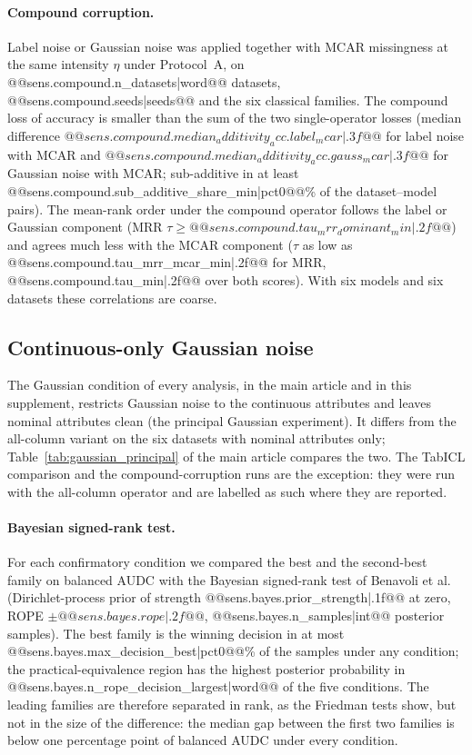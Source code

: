 \documentclass[pdflatex,sn-mathphys]{sn-jnl}
\theoremstyle{thmstyleone}
\begin{document}
\paragraph{Compound corruption.} Label noise or Gaussian noise was applied together with MCAR missingness at the same intensity $\eta$ under Protocol~A, on @@{sens.compound.n_datasets|word}@@ datasets, @@{sens.compound.seeds|seeds}@@ and the six classical families. The compound loss of accuracy is smaller than the sum of the two single-operator losses (median difference $@@{sens.compound.median_additivity_acc.label_mcar|.3f}@@$ for label noise with MCAR and $@@{sens.compound.median_additivity_acc.gauss_mcar|.3f}@@$ for Gaussian noise with MCAR; sub-additive in at least @@{sens.compound.sub_additive_share_min|pct0}@@\% of the dataset--model pairs). The mean-rank order under the compound operator follows the label or Gaussian component (MRR $\tau\ge@@{sens.compound.tau_mrr_dominant_min|.2f}@@$) and agrees much less with the MCAR component ($\tau$ as low as @@{sens.compound.tau_mrr_mcar_min|.2f}@@ for MRR, @@{sens.compound.tau_min|.2f}@@ over both scores). With six models and six datasets these correlations are coarse.

\subsection{Continuous-only Gaussian noise}
The Gaussian condition of every analysis, in the main article and in this supplement, restricts Gaussian noise to the continuous attributes and leaves nominal attributes clean (the principal Gaussian experiment). It differs from the all-column variant on the six datasets with nominal attributes only; Table~\ref{tab:gaussian_principal} of the main article compares the two. The TabICL comparison and the compound-corruption runs are the exception: they were run with the all-column operator and are labelled as such where they are reported.

\paragraph{Bayesian signed-rank test.} For each confirmatory condition we compared the best and the second-best family on balanced AUDC with the Bayesian signed-rank test of Benavoli et al.~\cite{benavoli2016should} (Dirichlet-process prior of strength @@{sens.bayes.prior_strength|.1f}@@ at zero, ROPE $\pm@@{sens.bayes.rope|.2f}@@$, @@{sens.bayes.n_samples|int}@@ posterior samples). The best family is the winning decision in at most @@{sens.bayes.max_decision_best|pct0}@@\% of the samples under any condition; the practical-equivalence region has the highest posterior probability in @@{sens.bayes.n_rope_decision_largest|word}@@ of the five conditions. The leading families are therefore separated in rank, as the Friedman tests show, but not in the size of the difference: the median gap between the first two families is below one percentage point of balanced AUDC under every condition.
\end{document}
